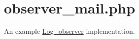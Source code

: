 \hypertarget{observer_mail_8php-example}{
\section{observer\_\-mail.php}
}
An example \hyperlink{class_log__observer}{Log\_\-observer} implementation.


\begin{DoxyCodeInclude}
\end{DoxyCodeInclude}
 